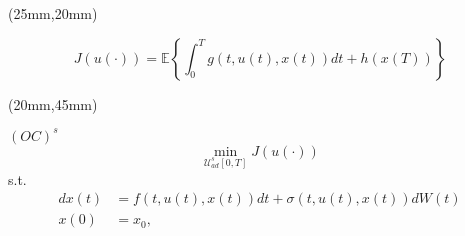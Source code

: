\begin{frame}
		\begin{textblock*}{80mm}(25mm,20mm)
		\begin{yellowbox}{}
			\begin{equation*}
				J(u(\cdot))= \mathbb{E}\left\{\int_{0}^{T}g(t,u(t),x(t))dt+h(x(T))\right\}
			\end{equation*}
		\end{yellowbox}
	\end{textblock*}
	
	
	\begin{textblock*}{90mm}(20mm,45mm)
		\begin{graybox}{$(OC)^s$}
			\begin{equation*}
				\min_{\mathcal{U}^s_{ad}[0,T]} J(u(\cdot))
			\end{equation*}
			s.t.
			\begin{align*}
				dx(t)&=
				f(t,u(t),x(t))dt+\sigma(t,u(t),x(t))dW(t)\\
				x(0)&=
				x_0,
			\end{align*}
		\end{graybox}
	\end{textblock*}
\end{frame}